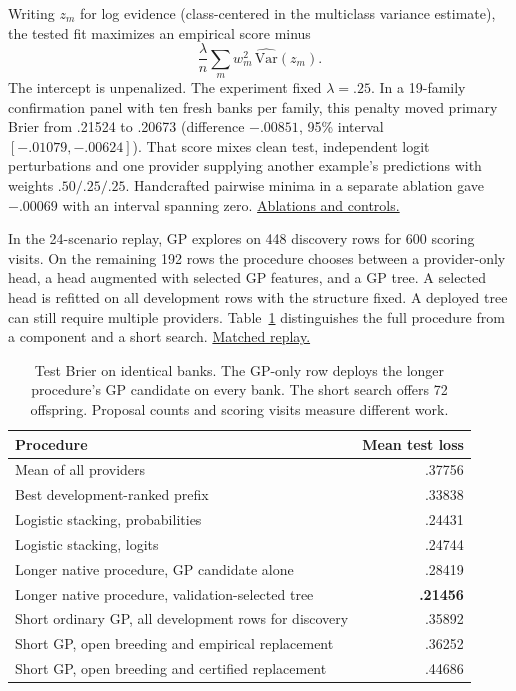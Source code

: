 \documentclass[10pt,a4paper]{article}
\newcommand{\FB}[2]{\href{https://github.com/damiankucharski/fusionbench/blob/5f9254e0c6e4559d7c0d19f28dc91641fba09d57/docs/ensemble-study/#1}{#2}}
\begin{document}
Writing $z_m$ for log evidence (class-centered in the multiclass variance estimate), the tested fit maximizes an empirical score minus
\[
 \frac{\lambda}{n}\sum_m w_m^2\,\widehat{\mathrm{Var}}(z_m).
\]
The intercept is unpenalized. The experiment fixed $\lambda=.25$. In a 19-family confirmation panel with ten fresh banks per family, this penalty moved primary Brier from .21524 to .20673 (difference $-.00851$, 95\% interval $[-.01079,-.00624]$). That score mixes clean test, independent logit perturbations and one provider supplying another example's predictions with weights $.50/.25/.25$. Handcrafted pairwise minima in a separate ablation gave $-.00069$ with an interval spanning zero. \FB{pattern-iterations/README.md}{Ablations and controls.}

In the 24-scenario replay, GP explores on 448 discovery rows for 600 scoring visits. On the remaining 192 rows the procedure chooses between a provider-only head, a head augmented with selected GP features, and a GP tree. A selected head is refitted on all development rows with the structure fixed. A deployed tree can still require multiple providers. Table~\ref{tab:panel} distinguishes the full procedure from a component and a short search. \FB{replacement-experiment/panel/compare_variants.py}{Matched replay.}

\begin{table}[htbp]\centering\small
\caption{Test Brier on identical banks. The GP-only row deploys the longer procedure's GP candidate on every bank. The short search offers 72 offspring. Proposal counts and scoring visits measure different work.}\label{tab:panel}
\begin{tabularx}{.98\linewidth}{@{}Xr@{}}\toprule
Procedure & Mean test loss\\\midrule
Mean of all providers & .37756\\
Best development-ranked prefix & .33838\\
Logistic stacking, probabilities & .24431\\
Logistic stacking, logits & .24744\\\addlinespace
Longer native procedure, GP candidate alone & .28419\\
Longer native procedure, validation-selected tree & \textbf{.21456}\\\addlinespace
Short ordinary GP, all development rows for discovery & .35892\\
Short GP, open breeding and empirical replacement & .36252\\
Short GP, open breeding and certified replacement & .44686\\\bottomrule
\end{tabularx}
\end{table}
\end{document}
